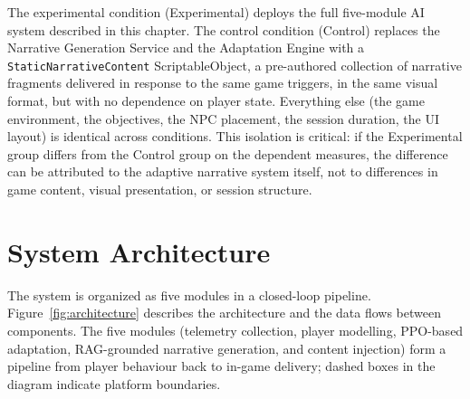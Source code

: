 The experimental condition (Experimental) deploys the full five-module AI system described in this chapter. The control condition (Control) replaces the Narrative Generation Service and the Adaptation Engine with a \texttt{StaticNarrativeContent} ScriptableObject, a pre-authored collection of narrative fragments delivered in response to the same game triggers, in the same visual format, but with no dependence on player state. Everything else (the game environment, the objectives, the NPC placement, the session duration, the UI layout) is identical across conditions. This isolation is critical: if the Experimental group differs from the Control group on the dependent measures, the difference can be attributed to the adaptive narrative system itself, not to differences in game content, visual presentation, or session structure.

\section{System Architecture}

The system is organized as five modules in a closed-loop pipeline. Figure~\ref{fig:architecture} describes the architecture and the data flows between components. The five modules (telemetry collection, player modelling, PPO-based adaptation, RAG-grounded narrative generation, and content injection) form a pipeline from player behaviour back to in-game delivery; dashed boxes in the diagram indicate platform boundaries.


